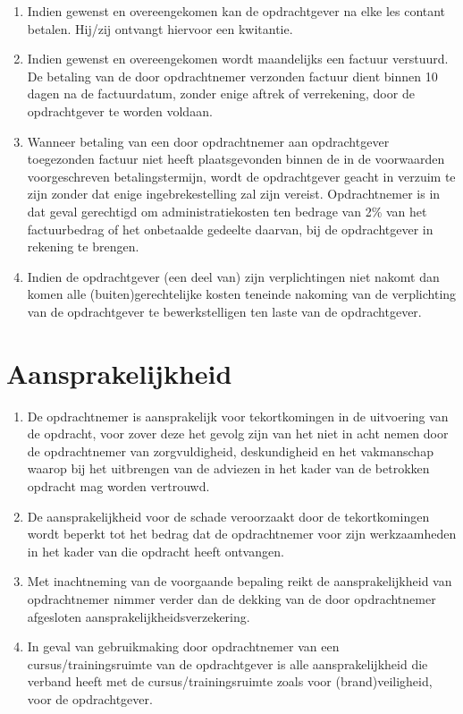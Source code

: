 \documentclass[a4paper]{article}
\begin{document}
\begin{enumerate}
	\item Indien gewenst en overeengekomen kan de opdrachtgever na elke les contant betalen. Hij/zij ontvangt hiervoor een kwitantie.
	\item Indien gewenst en overeengekomen wordt maandelijks een factuur verstuurd. De betaling van de door opdrachtnemer verzonden factuur dient binnen 10 dagen na de factuurdatum, zonder enige aftrek of verrekening, door de opdrachtgever te worden voldaan.
	\item Wanneer betaling van een door opdrachtnemer aan opdrachtgever toegezonden factuur niet heeft plaatsgevonden binnen de in de voorwaarden voorgeschreven betalingstermijn, wordt de opdrachtgever geacht in verzuim te zijn zonder dat enige ingebrekestelling zal zijn vereist. Opdrachtnemer is in dat geval gerechtigd om administratiekosten ten bedrage van 2\% van het factuurbedrag of het onbetaalde gedeelte daarvan, bij de opdrachtgever in rekening te brengen.
	\item Indien de opdrachtgever (een deel van) zijn verplichtingen niet nakomt dan komen alle (buiten)gerechtelijke kosten teneinde nakoming van de verplichting van de opdrachtgever te bewerkstelligen ten laste van de opdrachtgever.
\end{enumerate}

\section{Aansprakelijkheid}

\begin{enumerate}
	\item De opdrachtnemer is aansprakelijk voor tekortkomingen in de uitvoering van de opdracht, voor zover deze het gevolg zijn van het niet in acht nemen door de opdrachtnemer van zorgvuldigheid, deskundigheid en het vakmanschap waarop bij het uitbrengen van de adviezen in het kader van de betrokken opdracht mag worden vertrouwd.
	\item De aansprakelijkheid voor de schade veroorzaakt door de tekortkomingen wordt beperkt tot het bedrag dat de opdrachtnemer voor zijn werkzaamheden in het kader van die opdracht heeft ontvangen.
	\item Met inachtneming van de voorgaande bepaling reikt de aansprakelijkheid van opdrachtnemer nimmer verder dan de dekking van de door opdrachtnemer afgesloten aansprakelijkheidsverzekering.
	\item In geval van gebruikmaking door opdrachtnemer van een cursus/trainingsruimte van de opdrachtgever is alle aansprakelijkheid die verband heeft met de cursus/trainingsruimte zoals voor (brand)veiligheid, voor de opdrachtgever.
\end{enumerate}
\end{document}
